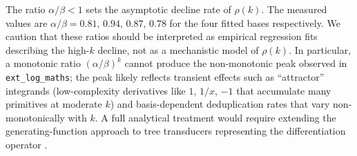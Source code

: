 \documentclass[preprint,12pt,authoryear]{elsarticle}
\newcommand{\rhok}{\rho(k)}
\newcommand{\hd}[1]{{\color{red}\textbf{[HD: #1]}}}
\begin{document}
The ratio $\alpha/\beta < 1$ sets the asymptotic decline rate of $\rhok$. The measured values are $\alpha/\beta = 0.81$, $0.94$, $0.87$, $0.78$ for the four fitted bases respectively. We caution that these ratios should be interpreted as empirical regression fits describing the high-$k$ decline, not as a mechanistic model of $\rhok$. In particular, a monotonic ratio $(\alpha/\beta)^k$ cannot produce the non-monotonic peak observed in \texttt{ext\_log\_maths}; the peak likely reflects transient effects such as ``attractor'' integrands (low-complexity derivatives like $1$, $1/x$, $-1$ that accumulate many primitives at moderate $k$) and basis-dependent deduplication rates that vary non-monotonically with $k$. A full analytical treatment would require extending the generating-function approach to tree transducers representing the differentiation operator \citep{FlajoletSedgewick2009}.



\end{document}
